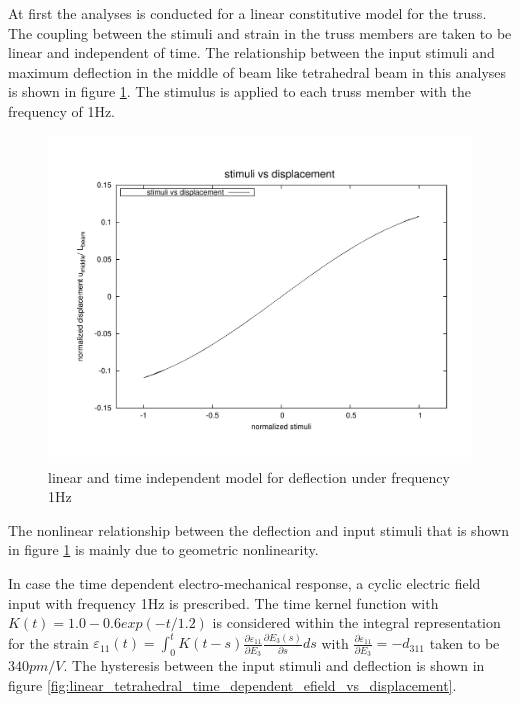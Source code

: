 At first the analyses is conducted for a linear constitutive model for the truss.
The coupling between the stimuli and strain in the truss members are taken to be linear and independent of time.
The relationship between the input stimuli and maximum deflection in the middle of beam like tetrahedral beam in this analyses is shown in figure \ref{fig:linear_static_stimuli_vs_displacement}.
The stimulus is applied to each truss member with the frequency of 1Hz.

\begin{figure} 
\centering
\includegraphics[width=5.0in]{./chap_5_active_trusses/images_non_linear_time_dependent_constitutive_equatio/linear_static_stimuli_vs_displacement.pdf}
\caption{linear and time independent model for deflection under frequency 1Hz}
\label{fig:linear_static_stimuli_vs_displacement}
\end{figure} 

The nonlinear relationship between the deflection and input stimuli that is shown in figure \ref{fig:linear_static_stimuli_vs_displacement} is mainly due to geometric nonlinearity.

In case the time dependent electro-mechanical response, a cyclic electric field input with frequency 1Hz is prescribed.
The time kernel function with 
$K(t)=1.0-0.6 exp(-t/1.2)$ is considered within the integral representation for the strain 
$\varepsilon_{11}(t)=\int_0^t
K(t-s)\frac{\partial \varepsilon_{11}}{\partial E_3}\frac{\partial
E_3(s)}{\partial s} ds$ 
with 
$\frac{\partial \varepsilon_{11}}{\partial
E_3}=-d_{311}$ 
taken to be 
$340 pm/V$.
The hysteresis between the input stimuli and deflection is shown in figure \ref{fig:linear_tetrahedral_time_dependent_efield_vs_displacement}.

